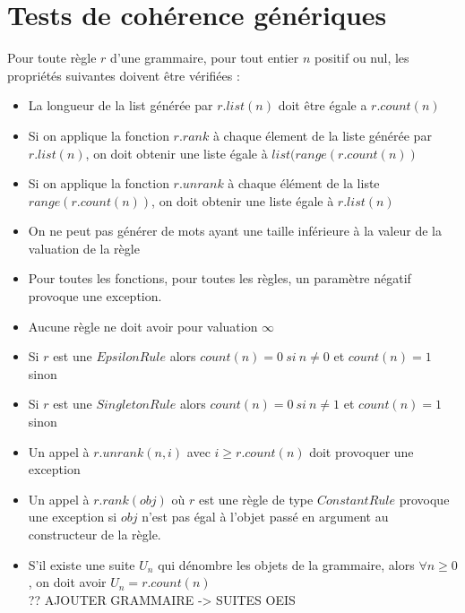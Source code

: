 \documentclass[a4paper, titlepage]{article}
\begin{document}
\section{Tests de cohérence génériques}

Pour toute règle $r$ d'une grammaire, pour tout entier $n$ positif ou
nul, les propriétés suivantes doivent être vérifiées :
\begin{itemize}
\item La longueur de la list générée par $r.list(n)$ doit être égale
  a $r.count(n)$\\
  
\item Si on applique la fonction $r.rank$ à chaque élement de la liste
  générée par $r.list(n)$, on doit obtenir une liste égale à
  $list(range(r.count(n))$\\
  
\item Si on applique la fonction $r.unrank$ à chaque élément de la
  liste $range(r.count(n))$, on doit obtenir une liste égale à $r.list(n)$\\
  
\item On ne peut pas générer de
  mots ayant une taille inférieure à la valeur de la valuation de la
  règle\\
  
\item Pour toutes les fonctions, pour toutes les règles, un paramètre négatif
  provoque une exception.\\

\item Aucune règle ne doit avoir pour valuation $\infty$\\

\item Si $r$ est une $EpsilonRule$ alors $count(n) = 0\ si\ n \neq 0$
  et $count(n) = 1$ sinon \\
  
\item Si $r$ est une $SingletonRule$ alors $count(n) = 0\ si\ n \neq
  1$ et $count(n)=1$ sinon \\

\item Un appel à $r.unrank(n, i)$ avec $i \geq r.count(n)$ doit provoquer
  une exception\\

\item Un appel à $r.rank(obj)$ où $r$ est une règle de type
  $ConstantRule$ provoque une exception si $obj$ n'est pas égal à
  l'objet passé en argument au constructeur de la règle.\\
  
\item S'il existe une suite $U_n$ qui dénombre les objets de la
  grammaire, alors $\forall n \geq 0$, on doit avoir $U_n =
  r.count(n)$\\
  ?? AJOUTER GRAMMAIRE -> SUITES OEIS
  
\end{itemize}
\end{document}
